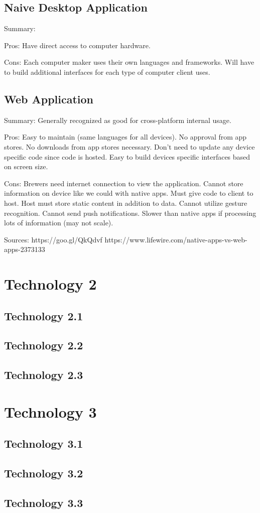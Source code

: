 \documentclass[draftclsnofoot,onecolumn,letterpaper,10pt,compsoc]{IEEEtran}
\begin{document}
    
	\subsection{Naive Desktop Application}
    Summary:
    
    Pros:
        Have direct access to computer hardware.
    
    Cons:
        Each computer maker uses their own languages and frameworks.
        Will have to build additional interfaces for each type of computer          client uses.
    
    
	\subsection{Web Application}
    Summary:
        Generally recognized as good for cross-platform internal usage.
    
    Pros:
        Easy to maintain (same languages for all devices).
        No approval from app stores.
        No downloads from app stores necessary.
        Don't need to update any device specific code since code is hosted.
        Easy to build devices specific interfaces based on screen size.
    
    Cons:
        Brewers need internet connection to view the application.
        Cannot store information on device like we could with native apps.
        Must give code to client to host.
        Host must store static content in addition to data.
        Cannot utilize gesture recognition.
        Cannot send push notifications.
        Slower than native apps if processing lots of information (may not          scale).
    
    Sources:
        https://goo.gl/QkQdvf
        https://www.lifewire.com/native-apps-vs-web-apps-2373133

\section{Technology 2}
	\subsection{Technology 2.1}
	\subsection{Technology 2.2}
	\subsection{Technology 2.3}

\section{Technology 3}
	\subsection{Technology 3.1}
	\subsection{Technology 3.2}
	\subsection{Technology 3.3}
\end{document}
